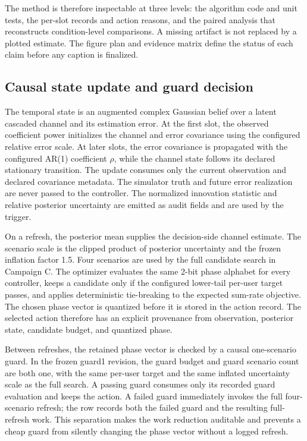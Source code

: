 \documentclass[10pt,twocolumn]{article}
\begin{document}
The method is therefore inspectable at three levels: the algorithm code
and unit tests, the per-slot records and action reasons, and the paired
analysis that reconstructs condition-level comparisons. A missing
artifact is not replaced by a plotted estimate. The figure plan and
evidence matrix define the status of each claim before any caption is
finalized.

\subsection{Causal state update and guard
decision}\label{causal-state-update-and-guard-decision}

The temporal state is an augmented complex Gaussian belief over a latent
cascaded channel and its estimation error. At the first slot, the
observed coefficient power initializes the channel and error covariance
using the configured relative error scale. At later slots, the error
covariance is propagated with the configured AR(1) coefficient \(\rho\),
while the channel state follows its declared stationary transition. The
update consumes only the current observation and declared covariance
metadata. The simulator truth and future error realization are never
passed to the controller. The normalized innovation statistic and
relative posterior uncertainty are emitted as audit fields and are used
by the trigger.

On a refresh, the posterior mean supplies the decision-side channel
estimate. The scenario scale is the clipped product of posterior
uncertainty and the frozen inflation factor 1.5. Four scenarios are used
by the full candidate search in Campaign C. The optimizer evaluates the
same 2-bit phase alphabet for every controller, keeps a candidate only
if the configured lower-tail per-user target passes, and applies
deterministic tie-breaking to the expected sum-rate objective. The
chosen phase vector is quantized before it is stored in the action
record. The selected action therefore has an explicit provenance from
observation, posterior state, candidate budget, and quantized phase.

Between refreshes, the retained phase vector is checked by a causal
one-scenario guard. In the frozen guard1 revision, the guard budget and
guard scenario count are both one, with the same per-user target and the
same inflated uncertainty scale as the full search. A passing guard
consumes only its recorded guard evaluation and keeps the action. A
failed guard immediately invokes the full four-scenario refresh; the row
records both the failed guard and the resulting full-refresh work. This
separation makes the work reduction auditable and prevents a cheap guard
from silently changing the phase vector without a logged refresh.
\end{document}
